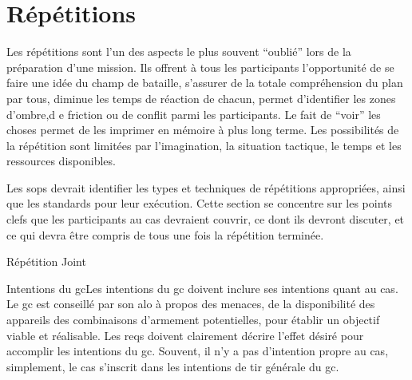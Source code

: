 \section{Répétitions}


\begin{e1}
	\item Les répétitions sont l'un des aspects le plus souvent ``oublié'' lors de la préparation d'une mission. Ils offrent à tous les participants l'opportunité de se faire une idée du champ de bataille, s'assurer de la totale compréhension du plan par tous, diminue les temps de réaction de chacun, permet d'identifier les zones d'ombre,d e friction ou de conflit parmi les participants. Le fait de ``voir'' les choses permet de les imprimer en mémoire à plus long terme. Les possibilités de la répétition sont limitées par l'imagination, la situation tactique, le temps et les ressources disponibles.
	\item Les \glspl{sop} devrait identifier les types et techniques de répétitions appropriées, ainsi que les standards pour leur exécution. Cette section se concentre sur les points clefs que les participants au \gls{cas} devraient couvrir, ce dont ils devront discuter, et ce qui devra être compris de tous une fois la répétition terminée.
	\item Répétition Joint
	\begin{e2}
		\item{Intentions du \gls{gc}}{Les intentions du \gls{gc} doivent inclure ses intentions quant au \gls{cas}. Le \gls{gc} est conseillé par son \gls{alo} à propos des menaces, de la disponibilité des appareils des combinaisons d'armement potentielles, pour établir un objectif viable et réalisable. Les \glspl{req} doivent clairement décrire l'effet désiré pour accomplir les intentions du \gls{gc}. Souvent, il n'y a pas d'intention propre au \gls{cas}, simplement, le \gls{cas} s'inscrit dans les intentions de tir générale du \gls{gc}.}

\end{e2}
\end{e1}
